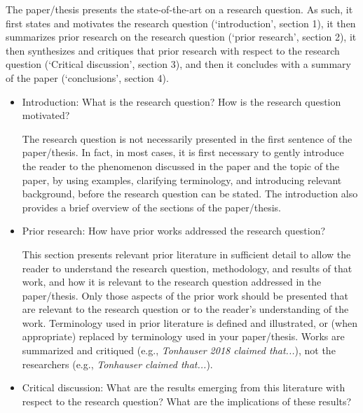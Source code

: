 \documentclass[11pt,fleqn,a4paper/thesis]{article}
\newcommand{\6}{\mbox{$[\hspace*{-.6mm}[$}}
\newcommand{\9}{\mbox{$]\hspace*{-.6mm}]$}}
\begin{document}
\begin{itemize}[itemsep=-1pt,leftmargin=2.5ex,topsep=-2pt]
\begin{enumerate}
The paper/thesis presents the state-of-the-art on a research question. As such, it first states and motivates the research question (`introduction', section 1), it then summarizes prior research on the research question (`prior research', section 2), it then synthesizes and critiques that prior research with respect to the research question (`Critical discussion', section 3), and then it concludes with a summary of the paper (`conclusions', section 4).

\begin{itemize}[leftmargin=2.5ex,topsep=-2pt]

\item Introduction: What is the research question? How is the research question motivated?

The research question is not necessarily presented in the first sentence of the paper/thesis. In fact, in most cases, it is first necessary to gently introduce the reader to the phenomenon discussed in the paper and the topic of the paper, by using examples, clarifying terminology, and introducing relevant background, before the research question can be stated. The introduction also provides a brief overview of the sections of the paper/thesis.

\item Prior research: How have prior works addressed the research question? 

This section presents relevant prior literature in sufficient detail to allow the reader to understand the research question, methodology, and results of that work, and how it is relevant to the research question addressed in the paper/thesis. Only those aspects of the prior work should be presented that are relevant to the research question or to the reader's understanding of the work. Terminology used in prior literature is defined and illustrated, or (when appropriate) replaced by terminology used in your paper/thesis. Works are summarized and critiqued (e.g., {\em Tonhauser 2018 claimed that...}), not the researchers (e.g., {\em Tonhauser claimed that...}). 

\item Critical discussion: What are the results emerging from this literature with respect to the research question? What are the implications of these results?


\end{itemize}
\end{enumerate}
\end{itemize}
\end{document}
